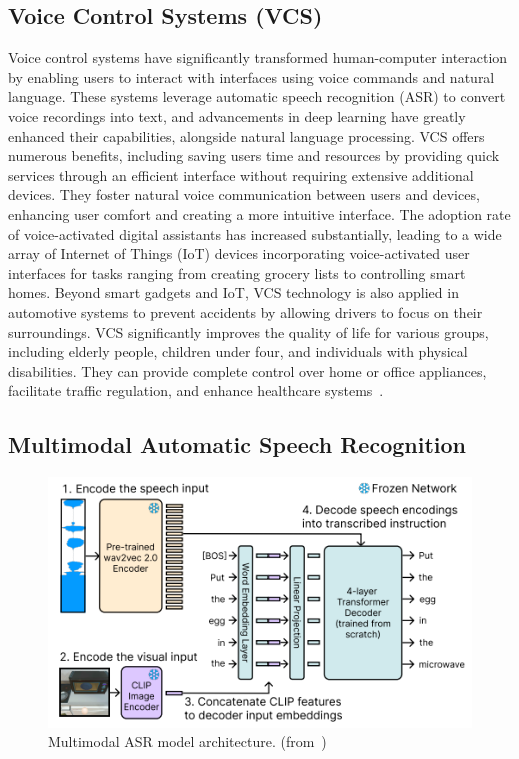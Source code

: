 \documentclass[12pt]{extarticle}
\begin{document}
\subsection{Voice Control Systems (VCS)}
Voice control systems have significantly transformed human-computer interaction by enabling users to interact with interfaces using voice commands and natural language. These systems leverage automatic speech recognition (ASR) to convert voice recordings into text, and advancements in deep learning have greatly enhanced their capabilities, alongside natural language processing. VCS offers numerous benefits, including saving users time and resources by providing quick services through an efficient interface without requiring extensive additional devices. They foster natural voice communication between users and devices, enhancing user comfort and creating a more intuitive interface. The adoption rate of voice-activated digital assistants has increased substantially, leading to a wide array of Internet of Things (IoT) devices incorporating voice-activated user interfaces for tasks ranging from creating grocery lists to controlling smart homes. Beyond smart gadgets and IoT, VCS technology is also applied in automotive systems to prevent accidents by allowing drivers to focus on their surroundings. VCS significantly improves the quality of life for various groups, including elderly people, children under four, and individuals with physical disabilities. They can provide complete control over home or office appliances, facilitate traffic regulation, and enhance healthcare systems~\cite{vcs}.

\subsection{Multimodal Automatic Speech Recognition}

\begin{figure}[htbp]
    \centering
    \includegraphics[width=0.8\linewidth]{asr}
    \caption{Multimodal ASR model architecture.
    (from~\cite{Chang2023})}
    \label{fig:asr}
\end{figure}
\end{document}
